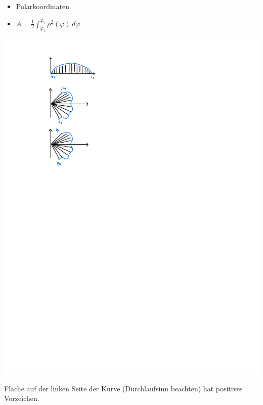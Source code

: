         \begin{minipage}{0.99\linewidth}
            \begin{minipage}{0.65\linewidth}
                \begin{itemize}
                    \item Polarkoordinaten
                    \item[] $ \displaystyle A= \frac{1}{2} \int_{\varphi_1}^{\varphi_2} \rho^2(\varphi) \, d\varphi $
                \end{itemize}
            \end{minipage}
            \begin{minipage}{0.34\linewidth}
                \includegraphics[width=0.6\linewidth]{src/Integralrechnung/polar.pdf}
            \end{minipage}
        \end{minipage}
        {\scriptsize Fläche auf der linken Seite der Kurve (Durchlaufsinn beachten) hat positives Vorzeichen.}